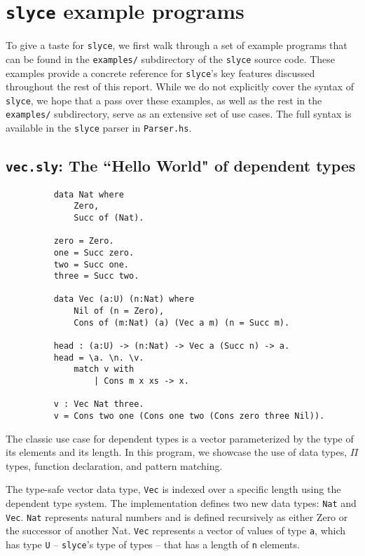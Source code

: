 \section{\texttt{slyce} example programs}
To give a taste for \texttt{slyce}, we first walk through a set of example
programs that can be found in the \texttt{examples/} subdirectory of the \texttt{slyce} source code.
These examples provide a concrete reference for \texttt{slyce}'s key features discussed throughout the rest of this report.
While we do not explicitly cover the syntax of \texttt{slyce}, we hope that a
pass over these examples, as well as the rest in the \texttt{examples/} subdirectory, serve as an extensive set of use cases.
The full syntax is available in the \texttt{slyce} parser in \texttt{Parser.hs}.
 
\subsection{\texttt{vec.sly}: The ``Hello World" of dependent types}
\begin{figure}[h!]
\begin{lstlisting}
    data Nat where
        Zero,
        Succ of (Nat).

    zero = Zero.
    one = Succ zero.
    two = Succ one.
    three = Succ two.

    data Vec (a:U) (n:Nat) where
        Nil of (n = Zero),
        Cons of (m:Nat) (a) (Vec a m) (n = Succ m).

    head : (a:U) -> (n:Nat) -> Vec a (Succ n) -> a.
    head = \a. \n. \v.
        match v with
            | Cons m x xs -> x.

    v : Vec Nat three.
    v = Cons two one (Cons one two (Cons zero three Nil)).
\end{lstlisting}
\end{figure}

The classic use case for dependent types is a vector parameterized by the type
of its elements and its length.
In this program, we showcase the use of data types, $\Pi$ types, function declaration, and pattern matching.

The type-safe vector data type, \texttt{Vec} is indexed over a specific length using the dependent type system. 
The implementation defines two new data types: \texttt{Nat} and \texttt{Vec}. 
\texttt{Nat} represents natural numbers and is defined recursively as either Zero or the successor of another Nat. 
\texttt{Vec} represents a vector of values of type \texttt{a}, which has type \texttt{U} -- \texttt{slyce}'s type of types -- that has a length of \texttt{n} elements.

